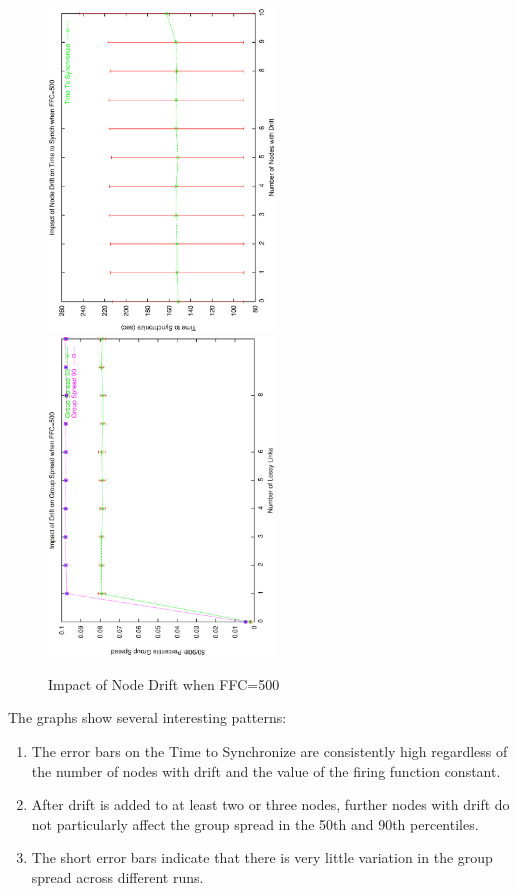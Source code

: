 \begin{figure}
\centerline{%
\includegraphics[width=6cm,angle=270]{figures/TTSvsDriftFFC500.ps}
\includegraphics[width=6cm,angle=270]{figures/GSvsDriftFFC500.ps}
}
\caption{Impact of Node Drift when FFC=500}
\label{fig:drift500}
\end{figure}


\noindent
The graphs show several interesting patterns:
\begin{enumerate}\addtolength{\itemsep}{-0.5\baselineskip}
\item The error bars on the Time to Synchronize are consistently high
regardless of the number of nodes with drift and the value of the firing function constant.
\item After drift is added to at least two or three nodes, further nodes with drift
do not particularly affect the group spread in the 50th and 90th percentiles.
\item The short error bars indicate that there is very little variation in the group spread 
across different runs.
\end{enumerate}


